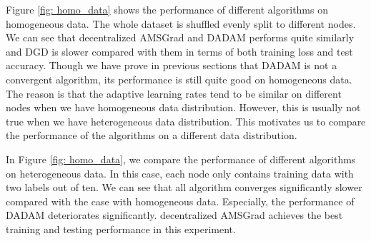 \documentclass{article} %
\begin{document}
Figure \ref{fig: homo_data} shows the performance of different algorithms on homogeneous data. The whole dataset is shuffled evenly split to different nodes. We can see that decentralized AMSGrad and DADAM performs quite similarly and DGD is slower compared with them in terms of both training loss and test accuracy. 
Though we have prove in previous sections that DADAM is not a convergent algorithm, its performance is still quite good on homogeneous data. The reason is that the adaptive learning rates tend to be similar on different nodes when we have homogeneous data distribution. However, this is usually not true when we have heterogeneous data distribution. This motivates us to compare the performance of the algorithms on a different data distribution. 

In Figure \ref{fig: homo_data}, we compare the performance of different algorithms on heterogeneous data. In this case, each node only contains training data with two labels out of ten. We can see that all algorithm converges significantly slower compared with the case with homogeneous data. Especially, the performance of DADAM deteriorates significantly. decentralized AMSGrad achieves the best training and testing performance in this experiment.
\end{document}
